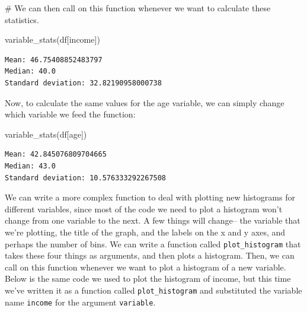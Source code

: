 \documentclass[
  letterpaper,
  DIV=11,
  numbers=noendperiod]{scrreprt}
\newenvironment{Shaded}{\begin{snugshade}}{\end{snugshade}}
\newcommand{\CommentTok}[1]{\textcolor[rgb]{0.37,0.37,0.37}{#1}}
\newcommand{\NormalTok}[1]{\textcolor[rgb]{0.00,0.23,0.31}{#1}}
\newcommand{\StringTok}[1]{\textcolor[rgb]{0.13,0.47,0.30}{#1}}
\begin{document}
\begin{Shaded}
\begin{Highlighting}[]
\CommentTok{\# We can then call on this function whenever we want to calculate these statistics. }

\NormalTok{variable\_stats(df[}\StringTok{\textquotesingle{}income\textquotesingle{}}\NormalTok{]) }
\end{Highlighting}
\end{Shaded}

\begin{verbatim}
Mean: 46.75408852483797
Median: 40.0
Standard deviation: 32.82190958000738
\end{verbatim}

Now, to calculate the same values for the age variable, we can simply
change which variable we feed the function:

\begin{Shaded}
\begin{Highlighting}[]
\NormalTok{variable\_stats(df[}\StringTok{\textquotesingle{}age\textquotesingle{}}\NormalTok{]) }
\end{Highlighting}
\end{Shaded}

\begin{verbatim}
Mean: 42.845076809704665
Median: 43.0
Standard deviation: 10.576333292267508
\end{verbatim}

We can write a more complex function to deal with plotting new
histograms for different variables, since most of the code we need to
plot a histogram won't change from one variable to the next. A few
things will change-- the variable that we're plotting, the title of the
graph, and the labels on the x and y axes, and perhaps the number of
bins. We can write a function called \texttt{plot\_histogram} that takes
these four things as arguments, and then plots a histogram. Then, we can
call on this function whenever we want to plot a histogram of a new
variable. Below is the same code we used to plot the histogram of
income, but this time we've written it as a function called
\texttt{plot\_histogram} and substituted the variable name
\texttt{income} for the argument \texttt{variable}.
\end{document}
